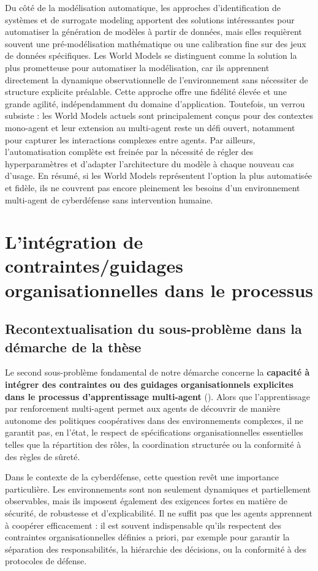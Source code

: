 Du côté de la modélisation automatique, les approches d’identification de systèmes et de surrogate modeling apportent des solutions intéressantes pour automatiser la génération de modèles à partir de données, mais elles requièrent souvent une pré-modélisation mathématique ou une calibration fine sur des jeux de données spécifiques. Les World Models se distinguent comme la solution la plus prometteuse pour automatiser la modélisation, car ils apprennent directement la dynamique observationnelle de l’environnement sans nécessiter de structure explicite préalable. Cette approche offre une fidélité élevée et une grande agilité, indépendamment du domaine d’application. Toutefois, un verrou subsiste : les World Models actuels sont principalement conçus pour des contextes mono-agent et leur extension au multi-agent reste un défi ouvert, notamment pour capturer les interactions complexes entre agents. Par ailleurs, l’automatisation complète est freinée par la nécessité de régler des hyperparamètres et d’adapter l’architecture du modèle à chaque nouveau cas d’usage. En résumé, si les World Models représentent l’option la plus automatisée et fidèle, ils ne couvrent pas encore pleinement les besoins d’un environnement multi-agent de cyberdéfense sans intervention humaine.

\section{L'intégration de contraintes/guidages organisationnelles dans le processus }

\subsection*{Recontextualisation du sous-problème dans la démarche de la thèse}

Le second sous-problème fondamental de notre démarche concerne la \textbf{capacité à intégrer des contraintes ou des guidages organisationnels explicites dans le processus d'apprentissage multi-agent} (). Alors que l'apprentissage par renforcement multi-agent permet aux agents de découvrir de manière autonome des politiques coopératives dans des environnements complexes, il ne garantit pas, en l'état, le respect de spécifications organisationnelles essentielles telles que la répartition des rôles, la coordination structurée ou la conformité à des règles de sûreté.

Dans le contexte de la cyberdéfense, cette question revêt une importance particulière. Les environnements sont non seulement dynamiques et partiellement observables, mais ils imposent également des exigences fortes en matière de sécurité, de robustesse et d'explicabilité. Il ne suffit pas que les agents apprennent à coopérer efficacement : il est souvent indispensable qu'ils respectent des contraintes organisationnelles définies a priori, par exemple pour garantir la séparation des responsabilités, la hiérarchie des décisions, ou la conformité à des protocoles de défense.

